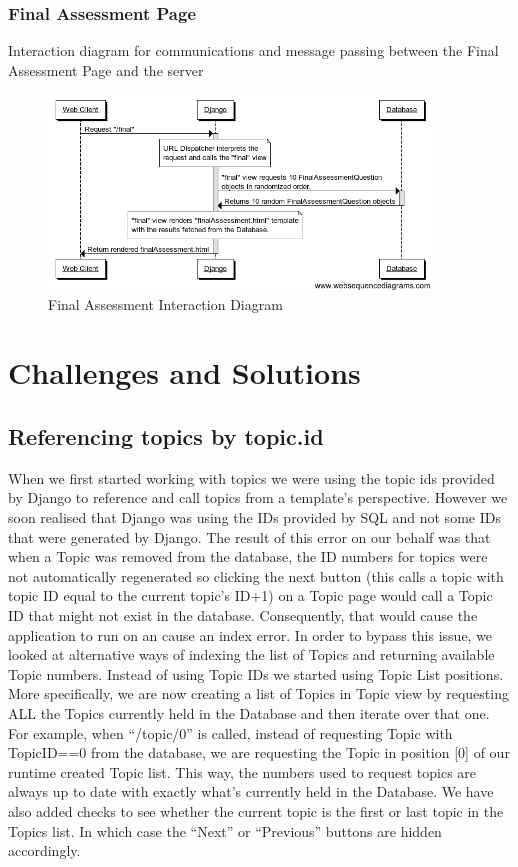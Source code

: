 \documentclass{l3proj}
\begin{document}
{\subsubsection{Final Assessment Page}
Interaction diagram for communications and message passing between the Final Assessment Page and the server
\begin{figure}[!htb]
\caption{Final Assessment Interaction Diagram}
 \centering
\includegraphics[width=0.9\textwidth]{images/finalAssessmentInteractionDiagram.png}
\end{figure}
\section{Challenges and Solutions}
\subsection{Referencing topics by topic.id}
When we first started working with topics we were using the topic ids
provided by Django to reference and call topics from a template's
perspective. However we soon realised that Django was using the IDs
provided by SQL and not some IDs that were generated by Django. The
result of this error on our behalf was that when a Topic was removed
from the database, the ID numbers for topics were not automatically
regenerated so clicking the next button (this calls a topic with topic
ID equal to the current topic's ID+1) on a Topic page would call a
Topic ID that might not exist in the database. Consequently, that
would cause the application to run on an cause an index error. In order to bypass this issue, we looked at alternative ways of indexing the list of Topics and returning available Topic numbers.  Instead of using Topic IDs we started using Topic List positions. More specifically, we are now creating a list of Topics in Topic view by requesting ALL the Topics currently held in the Database and then iterate over that one. For example, when “/topic/0” is called, instead of requesting Topic with TopicID==0 from the database, we are requesting the Topic in position [0] of our runtime created Topic list. This way, the numbers used to request topics are always up to date with exactly what's currently held in the Database.  We have also added checks to see whether the current topic is the first or last topic in the Topics list. In which case the “Next” or “Previous” buttons are hidden accordingly.

}
\end{document}
